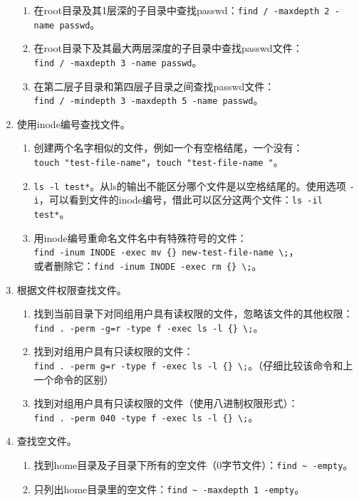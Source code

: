 \begin{enumerate}
\begin{enumerate}
      \item 在root目录及其1层深的子目录中查找passwd：\verb|find / -maxdepth 2 -name passwd|。
      \item 在root目录下及其最大两层深度的子目录中查找passwd文件：\\ \verb|find / -maxdepth 3 -name passwd|。
      \item 在第二层子目录和第四层子目录之间查找passwd文件：\\ \verb|find / -mindepth 3 -maxdepth 5 -name passwd|。
    \end{enumerate}
  \item 使用inode编号查找文件。
    \begin{enumerate}
      \item 创建两个名字相似的文件，例如一个有空格结尾，一个没有：\\ \verb|touch "test-file-name"|，\verb|touch "test-file-name "|。
      \item \verb|ls -l test*|。从ls的输出不能区分哪个文件是以空格结尾的。使用选项 \verb|-i|，可以看到文件的inode编号，借此可以区分这两个文件：\verb|ls -il test*|。
      \item 用inode编号重命名文件名中有特殊符号的文件：\\ \verb|find -inum INODE -exec mv {} new-test-file-name \;|，\\ 或者删除它：\verb|find -inum INODE -exec rm {} \;|。
    \end{enumerate}
  \item 根据文件权限查找文件。
    \begin{enumerate}
      \item 找到当前目录下对同组用户具有读权限的文件，忽略该文件的其他权限：\\ \verb|find . -perm -g=r -type f -exec ls -l {} \;|。
      \item 找到对组用户具有只读权限的文件：\\ \verb|find . -perm g=r -type f -exec ls -l {} \;|。（仔细比较该命令和上一个命令的区别）
      \item 找到对组用户具有只读权限的文件（使用八进制权限形式）：\\ \verb|find . -perm 040 -type f -exec ls -l {} \;|。
    \end{enumerate}
  \item 查找空文件。
    \begin{enumerate}
      \item 找到home目录及子目录下所有的空文件（0字节文件）：\verb|find ~ -empty|。
      \item 只列出home目录里的空文件：\verb|find ~ -maxdepth 1 -empty|。

\end{enumerate}
\end{enumerate}
